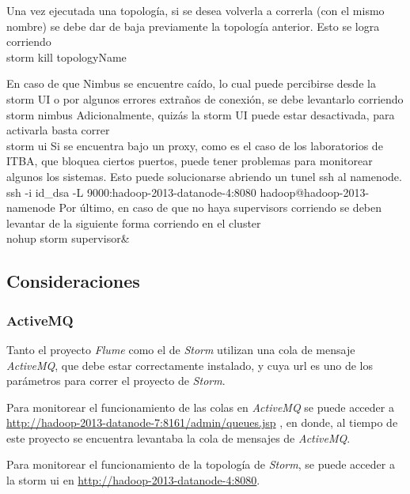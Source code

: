 \documentclass[a4paper,10pt]{article}
\begin{document}
Una vez ejecutada una topología, si se desea volverla a correrla (con el mismo nombre) se debe dar de baja previamente la topología anterior. Esto se logra corriendo
\\

	storm kill topologyName

En caso de que Nimbus se encuentre caído, lo cual puede percibirse desde la storm UI o por algunos errores extraños de conexión, se debe levantarlo corriendo
\\

    storm nimbus
Adicionalmente, quizás la storm UI puede estar desactivada, para activarla basta correr
\\
    storm ui
Si se encuentra bajo un proxy, como es el caso de los laboratorios de ITBA, que bloquea ciertos puertos, puede tener problemas para monitorear algunos los sistemas. 
Esto puede solucionarse abriendo un tunel ssh al namenode.
\\

    ssh -i id\_dsa -L 9000:hadoop-2013-datanode-4:8080 hadoop@hadoop-2013-namenode
Por último, en caso de que no haya supervisors corriendo se deben levantar de la siguiente forma corriendo en el cluster
\\

    nohup storm supervisor\&

\subsection{Consideraciones}

\subsubsection{ActiveMQ}

Tanto el proyecto \textit{Flume} como el de \textit{Storm} utilizan una cola de mensaje \textit{ActiveMQ}, que debe estar correctamente instalado,
y cuya url es uno de los parámetros para correr el proyecto de \textit{Storm}.

Para monitorear el funcionamiento de las colas en \textit{ActiveMQ} se puede acceder a
\href{http://hadoop-2013-datanode-7:8161/admin/queues.jsp}{http://hadoop-2013-datanode-7:8161/admin/queues.jsp}
, en donde, al tiempo de este proyecto 
se encuentra levantaba la cola de mensajes de \textit{ActiveMQ}.

Para monitorear el funcionamiento de la topología de \textit{Storm}, se puede acceder a la storm ui en 
\href{http://hadoop-2013-datanode-4:8080}{http://hadoop-2013-datanode-4:8080}.
\small
\end{document}
